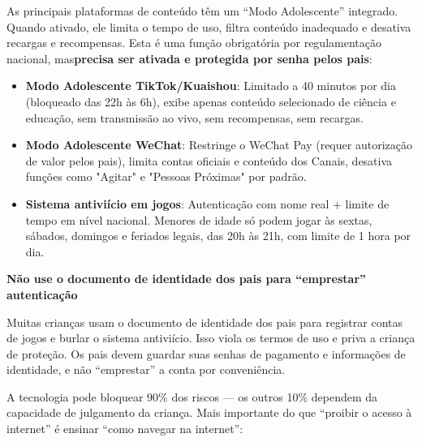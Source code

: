 As principais plataformas de conteúdo têm um “Modo Adolescente” integrado. Quando ativado, ele limita o tempo de uso, filtra conteúdo inadequado e desativa recargas e recompensas. Esta é uma função obrigatória por regulamentação nacional, mas\textbf{precisa ser ativada e protegida por senha pelos pais}:

\begin{itemize}
  \item \textbf{Modo Adolescente TikTok/Kuaishou}: Limitado a 40 minutos por dia (bloqueado das 22h às 6h), exibe apenas conteúdo selecionado de ciência e educação, sem transmissão ao vivo, sem recompensas, sem recargas.
  \item \textbf{Modo Adolescente WeChat}: Restringe o WeChat Pay (requer autorização de valor pelos pais), limita contas oficiais e conteúdo dos Canais, desativa funções como "Agitar" e "Pessoas Próximas" por padrão.
  \item \textbf{Sistema antiviício em jogos}: Autenticação com nome real + limite de tempo em nível nacional. Menores de idade só podem jogar às sextas, sábados, domingos e feriados legais, das 20h às 21h, com limite de 1 hora por dia.
\end{itemize}

\textbf{Não use o documento de identidade dos pais para “emprestar” autenticação}\par

Muitas crianças usam o documento de identidade dos pais para registrar contas de jogos e burlar o sistema antiviício. Isso viola os termos de uso e priva a criança de proteção. Os pais devem guardar suas senhas de pagamento e informações de identidade, e não “emprestar” a conta por conveniência.


A tecnologia pode bloquear 90\% dos riscos — os outros 10\% dependem da capacidade de julgamento da criança. Mais importante do que “proibir o acesso à internet” é ensinar “como navegar na internet”:

